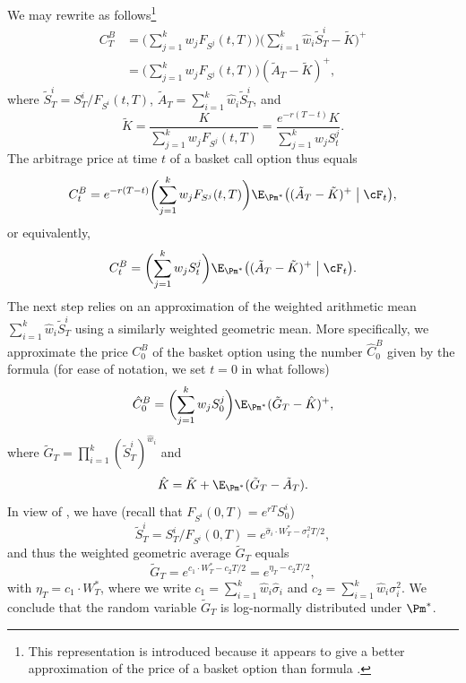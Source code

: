 We may rewrite  as follows\footnote{This representation is introduced because it appears to give a better approximation of the price of a basket option than formula .}
\begin{equation} \label{eq:BasketRewrite}
	\begin{aligned}
		C_T^B & = \biggl( \sum_{j=1}^k w_j F_{S^j}(t, T) \biggr) \biggl( \sum_{i=1}^k \hat{w}_i \tilde{S}_T^i - \tilde{K} \biggr)^+ \\
		      & = \biggl( \sum_{j=1}^k w_j F_{S^j}(t, T) \biggr) (\tilde{A}_T - \tilde{K})^+,
	\end{aligned}
\end{equation}
where $\tilde{S}_T^i = S_T^i / F_{S^i}(t, T)$, $\tilde{A}_T = \sum_{i=1}^k \hat{w}_i \tilde{S}_T^i$, and
\begin{equation} \label{eq:KtildeDef}
	\tilde{K} = \frac{K}{\sum_{j=1}^k w_j F_{S^j}(t, T)} = \frac{e^{-r(T-t)} K}{\sum_{j=1}^k w_j S_t^j}.
\end{equation}
The arbitrage price at time $t$ of a basket call option thus equals
\[
	C_t^B = e^{-r(T-t)} \biggl( \sum_{j=1}^k w_j F_{S^j}(t, T) \biggr) \E_{\Pm^*} \bigl( (\tilde{A}_T - \tilde{K})^+ \bigm| \cF_t \bigr),
\]
or equivalently,
\begin{equation} \label{eq:BasketPriceT}
	C_t^B = \biggl( \sum_{j=1}^k w_j S_t^j \biggr) \E_{\Pm^*} \bigl( (\tilde{A}_T - \tilde{K})^+ \bigm| \cF_t \bigr).
\end{equation}
The next step relies on an approximation of the weighted arithmetic mean $\sum_{i=1}^k \hat{w}_i \tilde{S}_T^i$ using a similarly weighted geometric mean. More specifically, we approximate the price $C_0^B$ of the basket option using the number $\hat{C}_0^B$ given by the formula (for ease of notation, we set $t = 0$ in what follows)
\begin{equation} \label{eq:BasketApproxPrice}
	\hat{C}_0^B = \biggl( \sum_{j=1}^k w_j S_0^j \biggr) \E_{\Pm^*} (\tilde{G}_T - \hat{K})^+,
\end{equation}
where $\tilde{G}_T = \prod_{i=1}^k (\tilde{S}_T^i)^{\hat{w}_i}$ and
\begin{equation} \label{eq:KhatDef}
	\hat{K} = \tilde{K} + \E_{\Pm^*} (\tilde{G}_T - \tilde{A}_T).
\end{equation}
In view of , we have (recall that $F_{S^i}(0, T) = e^{rT} S_0^i$)
\[
	\tilde{S}_T^i = S_T^i / F_{S^i}(0, T) = e^{\hat{\sigma}_i \cdot W_T^* - \sigma_i^2 T / 2},
\]
and thus the weighted geometric average $\tilde{G}_T$ equals
\begin{equation} \label{eq:GeometricAverage}
	\tilde{G}_T = e^{c_1 \cdot W_T^* - c_2 T / 2} = e^{\eta_T - c_2 T / 2},
\end{equation}
with $\eta_T = c_1 \cdot W_T^*$, where we write $c_1 = \sum_{i=1}^k \hat{w}_i \hat{\sigma}_i$ and $c_2 = \sum_{i=1}^k \hat{w}_i \sigma_i^2$. We conclude that the random variable $\tilde{G}_T$ is log-normally distributed under $\Pm^*$.

